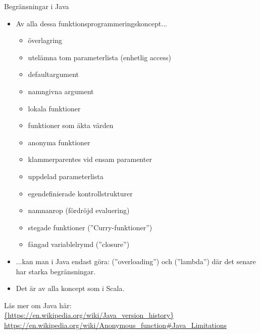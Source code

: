 \begin{Slide}{Begränsningar i Java}
\begin{itemize}\SlideFontTiny
\item[] Av alla dessa funktionsprogrammeringskoncept...
\begin{itemize}
\item överlagring
\item utelämna tom parameterlista (enhetlig access)
\item defaultargument
\item namngivna argument
\item lokala funktioner
\item funktioner som äkta värden
\item anonyma funktioner
\item klammerparentes vid ensam paramenter
\item uppdelad parameterlista
\item egendefinierade kontrollstrukturer
\item namnanrop (fördröjd evaluering)
\item stegade funktioner (''Curry-funktioner'')
\item fångad variablelrymd (''closure'')
\end{itemize}
\item[] ...kan man i Java %
endast göra:  (''overloading'') och  (''lambda'') där det senare har starka begränsningar. %

\item[] Det är  av alla koncept som  i Scala.
\end{itemize}
\ifkompendium\else
\vfill{} 
\fi Läs mer om Java här:\\
\url{{https://en.wikipedia.org/wiki/Java_version_history}}
\url{https://en.wikipedia.org/wiki/Anonymous_function\#Java_Limitations}

\end{Slide}


